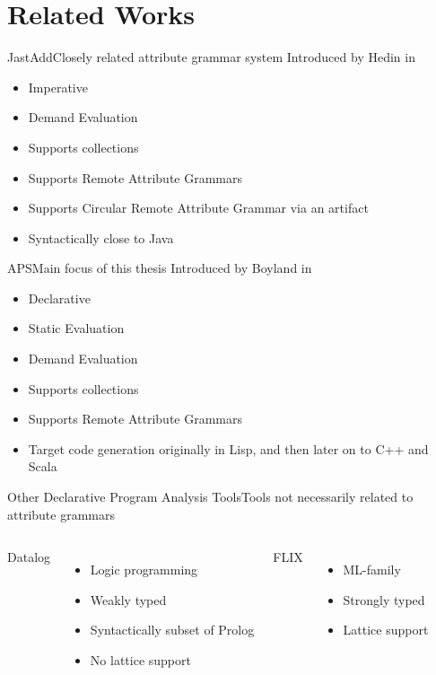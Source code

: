\section{Related Works}

\begin{frame}{JastAdd}{Closely related attribute grammar system}
Introduced by Hedin in \cite{DBLP:journals/entcs/HedinM01}
		
\begin{itemize}
    \item \alert{Imperative}
    \item Demand Evaluation
    \item Supports collections
    \item Supports Remote Attribute Grammars
    \item \alert{Supports Circular Remote Attribute Grammar} via an artifact
    \item Syntactically close to Java
\end{itemize}

\end{frame}

\begin{frame}{APS}{Main focus of this thesis}
Introduced by Boyland in \cite{10.5555/924544}
		
\begin{itemize}
    \item \alert{Declarative}
    \item \alert{Static Evaluation}
    \item Demand Evaluation
    \item Supports collections
    \item Supports Remote Attribute Grammars
    \item Target code generation originally in Lisp, and then later on to C++ and Scala
\end{itemize}

\end{frame}

\begin{frame}{Other Declarative Program Analysis Tools}{Tools not necessarily related to attribute grammars}

\begin{columns}
\alert{Datalog}
\begin{itemize}
    \item Logic programming
    \item Weakly typed
    \item Syntactically subset of Prolog
    \item No lattice support
\end{itemize}
\alert{FLIX}
\begin{itemize}
    \item ML-family
    \item Strongly typed
    \item Lattice support
\end{itemize}
\end{columns}

\end{frame}